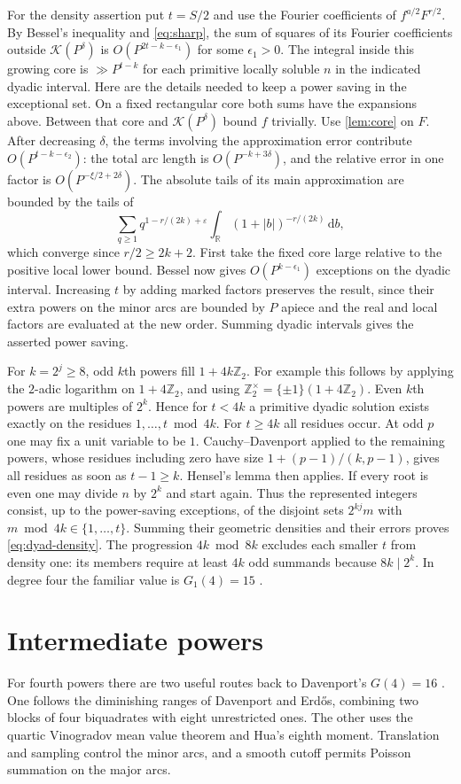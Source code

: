 \documentclass[11pt,letterpaper]{article}
\theoremstyle{definition}
\newcommand{\Z}{\mathbb Z}
\newcommand{\R}{\mathbb R}
\newcommand{\dd}{\,\mathrm d}
\newcommand{\eps}{\varepsilon}
\begin{document}
For the density assertion put $t=S/2$ and use the Fourier coefficients
of $f^{a/2}F^{r/2}$. By Bessel's inequality and \eqref{eq:sharp},
the sum of squares of its Fourier coefficients outside
$\mathcal K(P^\delta)$ is $O(P^{2t-k-\epsilon_1})$ for some
$\epsilon_1>0$. The integral inside this growing core is
$\gg P^{t-k}$ for each primitive locally soluble $n$ in the indicated
dyadic interval. Here are the details needed to keep a power saving
in the exceptional set. On a fixed rectangular core both sums have
the expansions above. Between that core and $\mathcal K(P^\delta)$
bound $f$ trivially. Use \cref{lem:core} on $F$. After decreasing
$\delta$, the terms involving the approximation error contribute
$O(P^{t-k-\epsilon_2})$: the total arc length is
$O(P^{-k+3\delta})$, and the relative error in one factor is
$O(P^{-\xi/2+2\delta})$. The absolute tails of its main approximation
are bounded by the tails of
\[
 \sum_{q\ge1}q^{1-r/(2k)+\eps}
 \int_{\R}(1+|b|)^{-r/(2k)}\dd b ,
\]
which converge since $r/2\ge2k+2$. First take the fixed core large
relative to the positive local lower bound. Bessel now gives
$O(P^{k-\epsilon_1})$ exceptions on the dyadic interval. Increasing
$t$ by adding marked factors preserves the result, since their extra
powers on the minor arcs are bounded by $P$ apiece and the real
and local factors are evaluated at the new order. Summing dyadic
intervals gives the asserted power saving.

For $k=2^j\ge8$, odd $k$th powers fill $1+4k\Z_2$.
For example this follows by applying the $2$-adic logarithm on
$1+4\Z_2$, and using $\Z_2^\times=\{\pm1\}(1+4\Z_2)$.
Even $k$th powers are multiples of $2^k$. Hence for $t<4k$ a primitive
dyadic solution exists exactly on the residues $1,\ldots,t\bmod4k$.
For $t\ge4k$ all residues occur. At odd $p$ one may fix a unit variable
to be $1$. Cauchy--Davenport applied to the remaining powers, whose
residues including zero have size $1+(p-1)/(k,p-1)$, gives all residues
as soon as $t-1\ge k$. Hensel's lemma then applies. If every root is
even one may divide $n$ by $2^k$ and start again. Thus the represented
integers consist, up to the power-saving exceptions, of the disjoint
sets $2^{kj}m$ with $m\bmod4k\in\{1,\ldots,t\}$. Summing their
geometric densities and their errors proves \eqref{eq:dyad-density}.
The progression $4k\bmod8k$ excludes each smaller $t$ from density
one: its members require at least $4k$ odd summands because
$8k\mid2^k$. In degree four the familiar value is $G_1(4)=15$
\cite{VWsurvey}.

\section{Intermediate powers}\label{sec:small}
For fourth powers there are two useful routes back to Davenport's
$G(4)=16$ \cite{DavenportFour}. One follows the diminishing ranges of
Davenport and Erd\H os, combining two blocks of four biquadrates with
eight unrestricted ones. The other uses the quartic Vinogradov mean
value theorem and Hua's eighth moment. Translation and sampling control
the minor arcs, and a smooth cutoff permits Poisson summation on the
major arcs.
\end{document}
